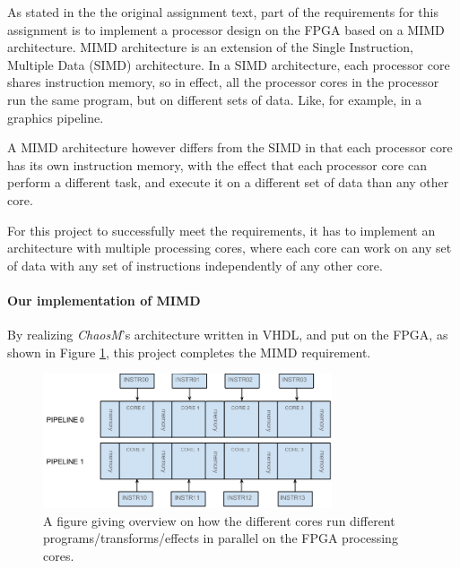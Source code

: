 As stated in the the original assignment text, part of the requirements for this
assignment is to implement a processor design on the FPGA based on a MIMD
architecture. MIMD architecture is an extension of the Single Instruction,
Multiple Data (SIMD) architecture. In a SIMD architecture, each processor core
shares instruction memory, so in effect, all the processor cores in the
processor run the same program, but on different sets of data. Like, for example,
in a graphics pipeline.

A MIMD architecture however differs from the SIMD in that each processor core
has its own instruction memory, with the effect that each processor core can
perform a different task, and execute it on a different set of data than any
other core.

For this project to successfully meet the requirements, it has to implement
an architecture with multiple processing cores, where each core can work on any
set of data with any set of instructions independently of any other core.

\paragraph{Our implementation of MIMD}
By realizing \textit{ChaosM}'s architecture written in VHDL, and put on the
FPGA, as shown in Figure \ref{fig:general_pipeline}, this project completes the
MIMD requirement.

\begin{figure}[H]
    \centering
    \includegraphics[height=150px]{figures/fpga/system_components_general_pipeline_without_programs.png}
    \caption{A figure giving overview on how the different cores run
different programs/transforms/effects in parallel on the FPGA processing cores.}
    \label{fig:general_pipeline}
\end{figure}
